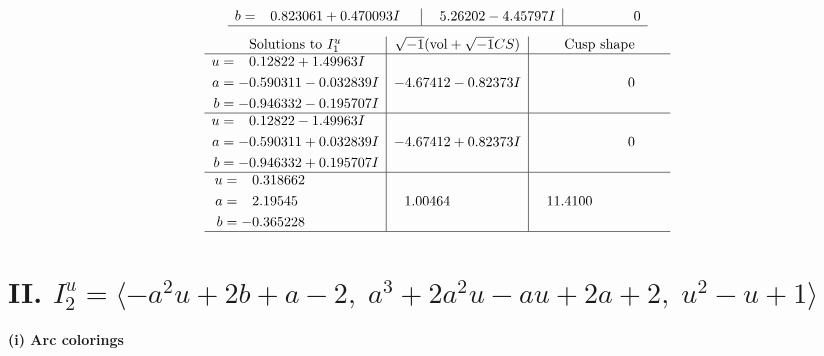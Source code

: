 \documentclass[1p]{elsarticle_modified}
\theoremstyle{definition}
\newcommand{\I}{\sqrt{-1}}
\begin{document}
$$\begin{array}{c|c|c}
\begin{aligned}
b &= \phantom{-}0.823061 + 0.470093 I\end{aligned}
 & \phantom{-}5.26202 - 4.45797 I & \phantom{-0.000000 } 0\\
 \hline 
 \end{array}$$\newpage$$\begin{array}{c|c|c}  
\text{Solutions to }I^u_{1}& \I (\text{vol} + \sqrt{-1}CS) & \text{Cusp shape}\\
 \hline 
\begin{aligned}
u &= \phantom{-}0.12822 + 1.49963 I \\
a &= -0.590311 - 0.032839 I \\
b &= -0.946332 - 0.195707 I\end{aligned}
 & -4.67412 - 0.82373 I & \phantom{-0.000000 } 0 \\ \hline\begin{aligned}
u &= \phantom{-}0.12822 - 1.49963 I \\
a &= -0.590311 + 0.032839 I \\
b &= -0.946332 + 0.195707 I\end{aligned}
 & -4.67412 + 0.82373 I & \phantom{-0.000000 } 0 \\ \hline\begin{aligned}
u &= \phantom{-}0.318662\phantom{ +0.000000I} \\
a &= \phantom{-}2.19545\phantom{ +0.000000I} \\
b &= -0.365228\phantom{ +0.000000I}\end{aligned}
 & \phantom{-}1.00464\phantom{ +0.000000I} & \phantom{-}11.4100\phantom{ +0.000000I}\\
 \hline 
 \end{array}$$\newpage\newpage\renewcommand{\arraystretch}{1}
\centering \section*{II. $I^u_{2}= \langle - a^2 u+2 b+a-2,\;a^3+2 a^2 u- a u+2 a+2,\;u^2- u+1 \rangle$}
\flushleft \textbf{(i) Arc colorings}\\
\end{document}
